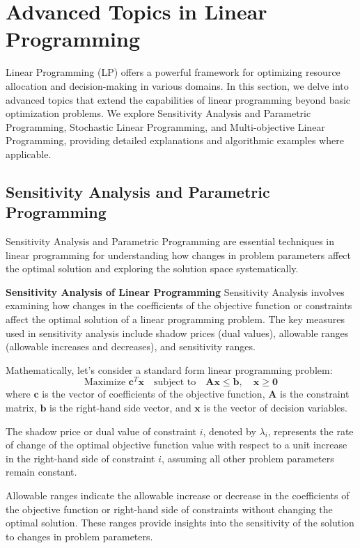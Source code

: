 \documentclass[12pt]{book} %
\begin{document}
\section{Advanced Topics in Linear Programming}

Linear Programming (LP) offers a powerful framework for optimizing resource allocation and decision-making in various domains. In this section, we delve into advanced topics that extend the capabilities of linear programming beyond basic optimization problems. We explore Sensitivity Analysis and Parametric Programming, Stochastic Linear Programming, and Multi-objective Linear Programming, providing detailed explanations and algorithmic examples where applicable.

\subsection{Sensitivity Analysis and Parametric Programming}

Sensitivity Analysis and Parametric Programming are essential techniques in linear programming for understanding how changes in problem parameters affect the optimal solution and exploring the solution space systematically.

\textbf{Sensitivity Analysis of Linear Programming}
\FloatBarrier
Sensitivity Analysis involves examining how changes in the coefficients of the objective function or constraints affect the optimal solution of a linear programming problem. The key measures used in sensitivity analysis include shadow prices (dual values), allowable ranges (allowable increases and decreases), and sensitivity ranges.

Mathematically, let's consider a standard form linear programming problem:
\[
\text{Maximize } \mathbf{c}^T \mathbf{x} \quad \text{subject to} \quad \mathbf{Ax} \leq \mathbf{b}, \quad \mathbf{x} \geq \mathbf{0}
\]
where $\mathbf{c}$ is the vector of coefficients of the objective function, $\mathbf{A}$ is the constraint matrix, $\mathbf{b}$ is the right-hand side vector, and $\mathbf{x}$ is the vector of decision variables.

The shadow price or dual value of constraint $i$, denoted by $\lambda_i$, represents the rate of change of the optimal objective function value with respect to a unit increase in the right-hand side of constraint $i$, assuming all other problem parameters remain constant.

Allowable ranges indicate the allowable increase or decrease in the coefficients of the objective function or right-hand side of constraints without changing the optimal solution. These ranges provide insights into the sensitivity of the solution to changes in problem parameters.
\end{document}
